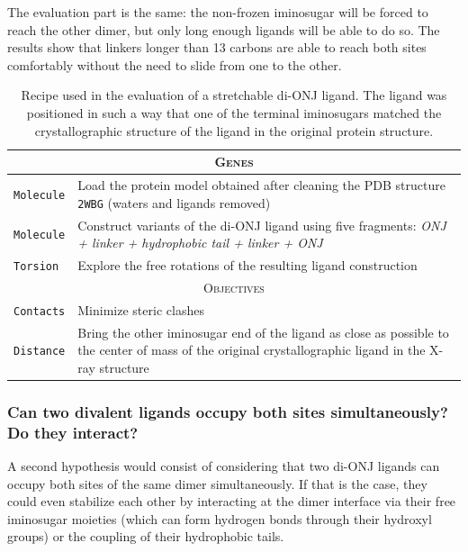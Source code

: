 The evaluation part is the same: the non-frozen iminosugar will be forced to reach the other dimer, but only long enough ligands will be able to do so. The results show that linkers longer than 13 carbons are able to reach both sites comfortably without the need to slide from one to the other.


\begin{table}[hbtp]
	\caption[Stretchable di-ONJ recipe]{Recipe used in the evaluation of a stretchable di-ONJ ligand. The ligand was positioned in such a way that one of the terminal iminosugars matched the crystallographic structure of the ligand in the original protein structure.\cite{pdb:2wbg}}
	\label{table:recipe-stretchable-divalent}
	\footnotesize
	\newcommand{\tableheading}[1]{\multicolumn{2}{c}{\textsc{#1}}}
	\begin{tabularx}{\textwidth}{RL}
		\toprule
		\tableheading{Genes}\\
		\toprule
		\texttt{Molecule} & Load the protein model obtained after cleaning the PDB structure \texttt{2WBG} (waters and ligands removed) \\
		\midrule
		\texttt{Molecule} & Construct variants of the di-ONJ ligand using five fragments: \textit{ONJ + linker + hydrophobic tail + linker + ONJ}\\
		\midrule
		\texttt{Torsion} & Explore the free rotations of the resulting ligand construction \\
		\toprule
		\tableheading{Objectives}\\
		\toprule
		\texttt{Contacts} & Minimize steric clashes \\
		\midrule
		\texttt{Distance} & Bring the other iminosugar end of the ligand as close as possible to the center of mass of the original crystallographic ligand in the X-ray structure\cite{pdb:2wbg} \\

		\bottomrule

	\end{tabularx}
\end{table}

\subsubsection[Can two divalent ligands occupy both sites simultaneously? Do they interact?]{Can two divalent ligands occupy both sites simultaneously? Do they interact?}
A second hypothesis would consist of considering that two di-ONJ ligands can occupy both sites of the same dimer simultaneously. If that is the case, they could even stabilize each other by interacting at the dimer interface via their free iminosugar moieties (which can form hydrogen bonds through their hydroxyl groups) or the coupling of their hydrophobic tails.

